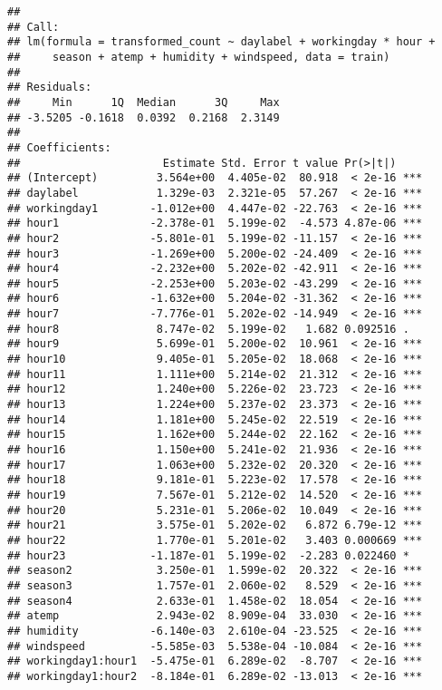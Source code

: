 \documentclass[]{article}
\begin{document}
\begin{verbatim}
## 
## Call:
## lm(formula = transformed_count ~ daylabel + workingday * hour + 
##     season + atemp + humidity + windspeed, data = train)
## 
## Residuals:
##     Min      1Q  Median      3Q     Max 
## -3.5205 -0.1618  0.0392  0.2168  2.3149 
## 
## Coefficients:
##                      Estimate Std. Error t value Pr(>|t|)    
## (Intercept)         3.564e+00  4.405e-02  80.918  < 2e-16 ***
## daylabel            1.329e-03  2.321e-05  57.267  < 2e-16 ***
## workingday1        -1.012e+00  4.447e-02 -22.763  < 2e-16 ***
## hour1              -2.378e-01  5.199e-02  -4.573 4.87e-06 ***
## hour2              -5.801e-01  5.199e-02 -11.157  < 2e-16 ***
## hour3              -1.269e+00  5.200e-02 -24.409  < 2e-16 ***
## hour4              -2.232e+00  5.202e-02 -42.911  < 2e-16 ***
## hour5              -2.253e+00  5.203e-02 -43.299  < 2e-16 ***
## hour6              -1.632e+00  5.204e-02 -31.362  < 2e-16 ***
## hour7              -7.776e-01  5.202e-02 -14.949  < 2e-16 ***
## hour8               8.747e-02  5.199e-02   1.682 0.092516 .  
## hour9               5.699e-01  5.200e-02  10.961  < 2e-16 ***
## hour10              9.405e-01  5.205e-02  18.068  < 2e-16 ***
## hour11              1.111e+00  5.214e-02  21.312  < 2e-16 ***
## hour12              1.240e+00  5.226e-02  23.723  < 2e-16 ***
## hour13              1.224e+00  5.237e-02  23.373  < 2e-16 ***
## hour14              1.181e+00  5.245e-02  22.519  < 2e-16 ***
## hour15              1.162e+00  5.244e-02  22.162  < 2e-16 ***
## hour16              1.150e+00  5.241e-02  21.936  < 2e-16 ***
## hour17              1.063e+00  5.232e-02  20.320  < 2e-16 ***
## hour18              9.181e-01  5.223e-02  17.578  < 2e-16 ***
## hour19              7.567e-01  5.212e-02  14.520  < 2e-16 ***
## hour20              5.231e-01  5.206e-02  10.049  < 2e-16 ***
## hour21              3.575e-01  5.202e-02   6.872 6.79e-12 ***
## hour22              1.770e-01  5.201e-02   3.403 0.000669 ***
## hour23             -1.187e-01  5.199e-02  -2.283 0.022460 *  
## season2             3.250e-01  1.599e-02  20.322  < 2e-16 ***
## season3             1.757e-01  2.060e-02   8.529  < 2e-16 ***
## season4             2.633e-01  1.458e-02  18.054  < 2e-16 ***
## atemp               2.943e-02  8.909e-04  33.030  < 2e-16 ***
## humidity           -6.140e-03  2.610e-04 -23.525  < 2e-16 ***
## windspeed          -5.585e-03  5.538e-04 -10.084  < 2e-16 ***
## workingday1:hour1  -5.475e-01  6.289e-02  -8.707  < 2e-16 ***
## workingday1:hour2  -8.184e-01  6.289e-02 -13.013  < 2e-16 ***

\end{verbatim}
\end{document}

